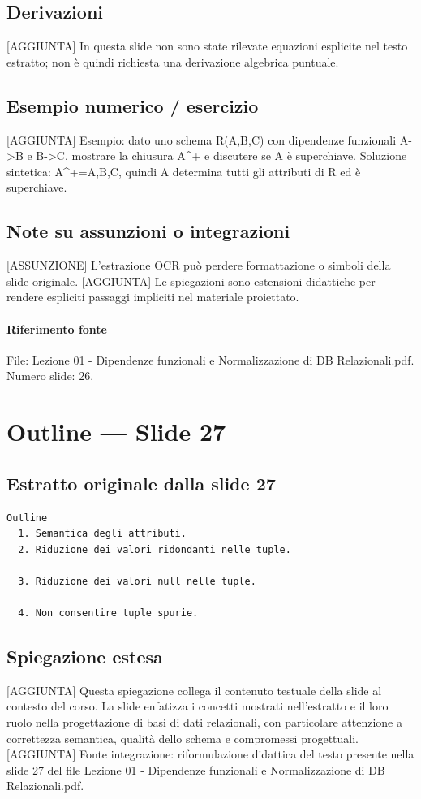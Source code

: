 \documentclass[11pt]{article}
\begin{document}
\subsection*{Derivazioni}
[AGGIUNTA] In questa slide non sono state rilevate equazioni esplicite nel testo estratto; non è quindi richiesta una derivazione algebrica puntuale.
\subsection*{Esempio numerico / esercizio}
[AGGIUNTA] Esempio: dato uno schema R(A,B,C) con dipendenze funzionali A->B e B->C, mostrare la chiusura A^+ e discutere se A è superchiave. Soluzione sintetica: A^+={A,B,C}, quindi A determina tutti gli attributi di R ed è superchiave.
\subsection*{Note su assunzioni o integrazioni}
[ASSUNZIONE] L'estrazione OCR può perdere formattazione o simboli della slide originale.
[AGGIUNTA] Le spiegazioni sono estensioni didattiche per rendere espliciti passaggi impliciti nel materiale proiettato.
\paragraph{Riferimento fonte} File: Lezione 01 - Dipendenze funzionali e Normalizzazione di DB Relazionali.pdf. Numero slide: 26.
\section{Outline --- Slide 27}
\subsection*{Estratto originale dalla slide 27}
\begin{lstlisting}
Outline
  1. Semantica degli attributi.
  2. Riduzione dei valori ridondanti nelle tuple.

  3. Riduzione dei valori null nelle tuple.

  4. Non consentire tuple spurie.
\end{lstlisting}
\subsection*{Spiegazione estesa}
[AGGIUNTA] Questa spiegazione collega il contenuto testuale della slide al contesto del corso. La slide enfatizza i concetti mostrati nell'estratto e il loro ruolo nella progettazione di basi di dati relazionali, con particolare attenzione a correttezza semantica, qualità dello schema e compromessi progettuali.
[AGGIUNTA] Fonte integrazione: riformulazione didattica del testo presente nella slide 27 del file Lezione 01 - Dipendenze funzionali e Normalizzazione di DB Relazionali.pdf.
\end{document}
